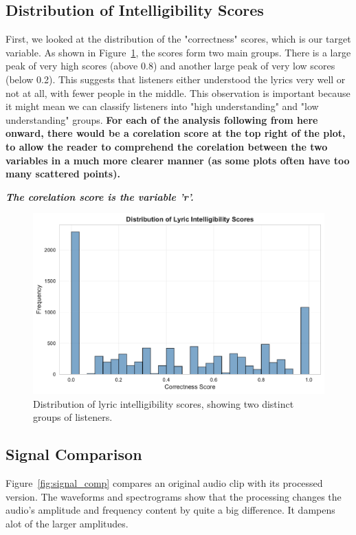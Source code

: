 \documentclass[conference]{IEEEtran}
\begin{document}
\subsection{Distribution of Intelligibility Scores}
First, we looked at the distribution of the "correctness" scores, which is our target variable. As shown in Figure~\ref{fig:target_dist}, the scores form two main groups. There is a large peak of very high scores (above 0.8) and another large peak of very low scores (below 0.2). This suggests that listeners either understood the lyrics very well or not at all, with fewer people in the middle. This observation is important because it might mean we can classify listeners into "high understanding" and "low understanding" groups. \textbf{For each of the analysis following from here onward, there would be a corelation score at the top right of the plot,  to allow the reader to comprehend the corelation between the two variables in a much more clearer manner (as some plots often have too many scattered points).}

\textit{\textbf{The corelation score is the variable 'r'.
}}
\begin{figure}[htbp]
    \centering
    \includegraphics[width=\columnwidth]{plots_assignment_1/figure_1_target_distribution.pdf}
    \caption{Distribution of lyric intelligibility scores, showing two distinct groups of listeners.}
    \label{fig:target_dist}
\end{figure}

\subsection{Signal Comparison}
Figure~\ref{fig:signal_comp} compares an original audio clip with its processed version. The waveforms and spectrograms show that the processing changes the audio's amplitude and frequency content by quite a big difference. It dampens alot of the larger amplitudes.
\end{document}

